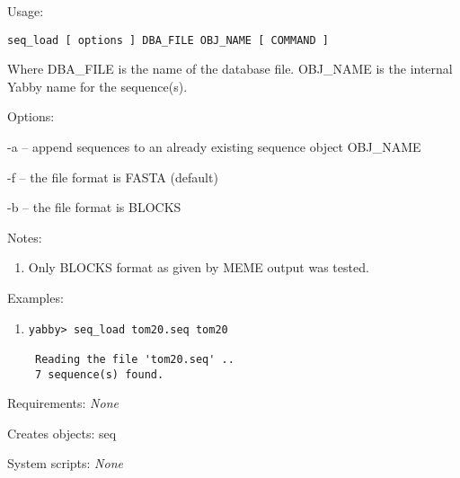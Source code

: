 \begin{description}


\item{Usage:}

{\tt seq\_load [ options ] DBA\_FILE OBJ\_NAME [ COMMAND ]}

Where DBA\_FILE is the name of the database file. OBJ\_NAME is
the internal Yabby name for the sequence(s).


\item{Options:}
\begin{description}
\item -a -- append sequences to an already existing sequence
object OBJ\_NAME
\item -f -- the file format is FASTA (default)
\item -b -- the file format is BLOCKS
\end{description}


\item{Notes:}
\begin{enumerate}
\item Only BLOCKS format as given by MEME output was tested.
\end{enumerate}


\item{Examples:}
\begin{enumerate}

\item
\begin{verbatim}
yabby> seq_load tom20.seq tom20

 Reading the file 'tom20.seq' ..
 7 sequence(s) found.
\end{verbatim}

\end{enumerate}


\item{Requirements:} {\em None}


\item{Creates objects:} seq


\item{System scripts:} {\em None}

\end{description}


